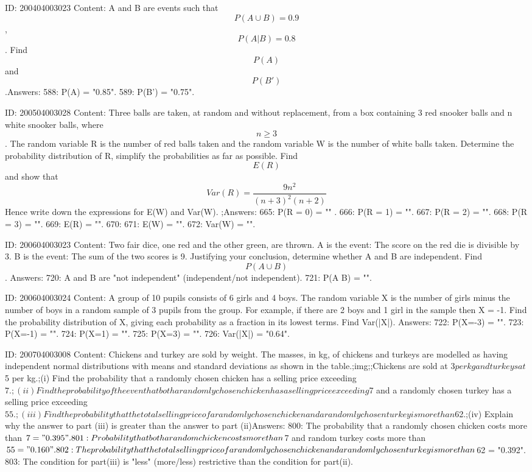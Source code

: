 \documentclass{article}
\begin{document}
ID: 200404003023
Content:
A and B are events such that $$P(A \cup B) = 0.9$$, $$P (A|B)=0.8$$. Find $$P(A)$$ and $$P(B')$$.Answers:
588: P(A) = "0.85".
589: P(B') = "0.75".

ID: 200504003028
Content:
Three balls are taken, at random and without replacement, from a box containing 3 red snooker balls and n white snooker balls, where $$n \geq 3$$. The random variable R is the number of red balls taken and the random variable W is the number of white balls taken. Determine the probability distribution of R, simplify the probabilities as far as possible. Find $$E(R)$$ and show that $$Var\left(R\right) = \frac{9 n^2}{{\left(n + 3\right)}^2 \left(n + 2\right)}$$ Hence write down the expressions for E(W) and Var(W). ;Answers:
665: P(R = 0) = "" .
666: P(R = 1) = "".
667: P(R = 2) = "".
668: P(R = 3) = "".
669: E(R) = "".
670: 
671: E(W) = "".
672: Var(W) = "".

ID: 200604003023
Content:
Two fair dice, one red and the other green, are thrown. A is the event: The score on the red die is divisible by 3. B is the event: The sum of the two scores is 9. Justifying your conclusion, determine whether A and B are independent.  Find $$P(A \cup B)$$. Answers:
720: A and B are "not independent" (independent/not independent).
721: P(A \cup B) = "".

ID: 200604003024
Content:
A group of 10 pupils consists of 6 girls and 4 boys. The random variable X is the number of girls minus the number of boys in a random sample of 3 pupils from the group. For example, if there are 2 boys and 1 girl in the sample then X = -1. Find the probability distribution of X, giving each probability as a fraction in its lowest terms. Find Var(|X|). Answers:
722: P(X=-3) = "".
723: P(X=-1) = "".
724: P(X=1) = "".
725: P(X=3) = "".
726: Var(|X|) = "0.64".

ID: 200704003008
Content:
Chickens and turkey are sold by weight. The masses, in kg, of chickens and turkeys are modelled as having independent normal distributions with means and standard deviations as shown in the table.;img;;Chickens are sold at $3 per kg and turkeys at $5 per kg.;(i) Find the probability that a randomly chosen chicken has a selling price exceeding $7.;(ii) Find the probability of the even that both a randomly chosen chicken has a selling price exceeding $7 and a randomly chosen turkey has a selling price exceeding $55.;(iii) Find the probability that the total selling price of a randomly chosen chicken and a randomly chosen turkey is more than $62.;(iv) Explain why the answer to part (iii) is greater than the answer to part (ii)Answers:
800: The probability that a randomly chosen chicken costs more than $7 = "0.395".
801: Probability that both a random chicken costs more than $7 and random turkey costs more than $55 = "0.160".
802: The probability that the total selling price of a randomly chosen chicken and a randomly chosen turkey is more than $62 = "0.392".
803: The condition for part(iii) is "less" (more/less) restrictive than the condition for part(ii).
\end{document}
